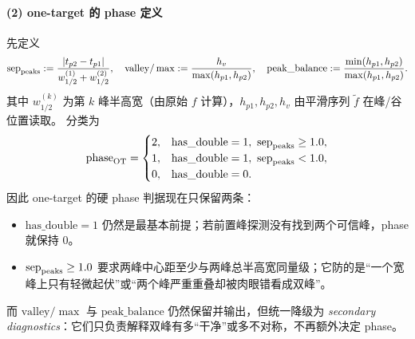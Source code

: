\documentclass[11pt,fontset=fandol]{ctexart}
\begin{document}
\paragraph{(2) one-target 的 phase 定义}
先定义
\[
\mathrm{sep}_{\rm peaks}:=\frac{|t_{p2}-t_{p1}|}{w_{1/2}^{(1)}+w_{1/2}^{(2)}},\quad
\mathrm{valley}/\max:=\frac{h_v}{\max(h_{p1},h_{p2})},\quad
\mathrm{peak\_balance}:=\frac{\min(h_{p1},h_{p2})}{\max(h_{p1},h_{p2})}.
\]
其中 $w_{1/2}^{(k)}$ 为第 $k$ 峰半高宽（由原始 $f$ 计算），$h_{p1},h_{p2},h_v$ 由平滑序列 $\tilde f$ 在峰/谷位置读取。
分类为
\[
\mathrm{phase}_{\rm OT}=
\begin{cases}
2,& \mathrm{has\_double}=1,\ \mathrm{sep}_{\rm peaks}\ge 1.0,\\
1,& \mathrm{has\_double}=1,\ \mathrm{sep}_{\rm peaks}< 1.0,\\
0,& \mathrm{has\_double}=0.
\end{cases}
\]
因此 one-target 的硬 phase 判据现在只保留两条：
\begin{itemize}
  \item $\mathrm{has\_double}=1$ 仍然是最基本前提；若前置峰探测没有找到两个可信峰，phase 就保持 0。
  \item $\mathrm{sep}_{\rm peaks}\ge 1.0$ 要求两峰中心距至少与两峰总半高宽同量级；它防的是“一个宽峰上只有轻微起伏”或“两个峰严重重叠却被肉眼错看成双峰”。
\end{itemize}
而 $\mathrm{valley}/\max$ 与 $\mathrm{peak\_balance}$ 仍然保留并输出，但统一降级为 \emph{secondary diagnostics}：它们只负责解释双峰有多“干净”或多不对称，不再额外决定 phase。
\end{document}
